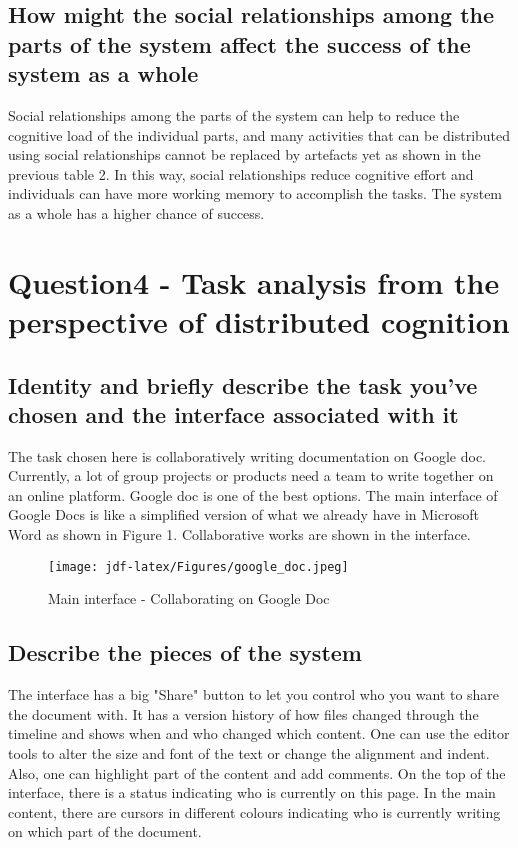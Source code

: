 \documentclass[
	letterpaper, %
]{jdf}
\begin{document}
\subsection{How might the social relationships among the parts of the system affect the success of the system as a whole}

Social relationships among the parts of the system can help to reduce the cognitive load of the individual parts, and many activities that can be distributed using social relationships cannot be replaced by artefacts yet as shown in the previous table 2. In this way, social relationships reduce cognitive effort and individuals can have more working memory to accomplish the tasks. The system as a whole has a higher chance of success.


\section{Question4 - Task analysis from the perspective of distributed cognition}

\subsection{Identity and briefly describe the task you’ve chosen and the interface associated with it}
The task chosen here is collaboratively writing documentation on Google doc. Currently, a lot of group projects or products need a team to write together on an online platform. Google doc is one of the best options. The main interface of Google Docs is like a simplified version of what we already have in Microsoft Word as shown in Figure 1. Collaborative works are shown in the interface.

\begin{figure}[h]
	\centering
	\texttt{[image: jdf-latex/Figures/google\_doc.jpeg]}
	\caption{Main interface - Collaborating on Google Doc}
	\label{fig:googledoc}
\end{figure}


\subsection{Describe the pieces of the system}

The interface has a big "Share" button to let you control who you want to share the document with. It has a version history of how files changed through the timeline and shows when and who changed which content. One can use the editor tools to alter the size and font of the text or change the alignment and indent. Also, one can highlight part of the content and add comments. On the top of the interface, there is a status indicating who is currently on this page. In the main content, there are cursors in different colours indicating who is currently writing on which part of the document.
\end{document}
